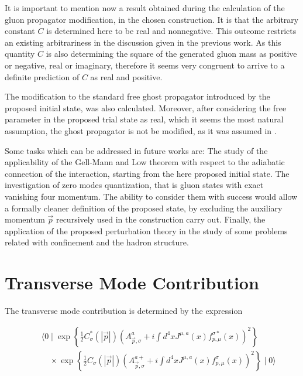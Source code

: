 \documentclass[12pt,letterpaper]{report}
\begin{document}
It is important to mention now a result obtained during the
calculation of the gluon propagator modification, in the chosen
construction. It is that the arbitrary constant $C$ is determined
here to be real and nonnegative. This outcome restricts an
existing arbitrariness in the discussion given in the previous
work. As this quantity $C$ is also determining the square of the
generated gluon mass as positive or negative, real or imaginary,
therefore it seems very congruent to arrive to a definite
prediction of $C$ as real and positive.

The modification to the standard free ghost propagator introduced
by the proposed initial state, was also calculated. Moreover,
after considering the free parameter in the proposed trial state
as real, which it seems the most natural assumption, the ghost
propagator is not be modified, as it was assumed in \cite{Cabo}.

Some tasks which can be addressed in future works are: The study
of the applicability of the Gell-Mann and Low theorem with respect
to the adiabatic connection of the interaction, starting from the
here proposed initial state. The investigation of zero modes
quantization, that is gluon states with exact vanishing four
momentum. The ability to consider them with success would allow a
formally cleaner definition of the proposed state, by excluding
the auxiliary momentum $\vec{p}$ recursively used in the
construction carry out. Finally, the application of the proposed
perturbation theory in the study of some problems related with
confinement and the hadron structure.

\appendix

\chapter{Transverse Mode Contribution}

The transverse mode contribution is determined by the expression

\begin{eqnarray}
&&\langle 0\mid \exp \left\{ \frac 12C_\sigma ^{*}\left(\left|
\vec{p} \right| \right) \left(A_{\vec{p},\sigma }^a+i\int
d^4xJ^{\mu,a}\left(x\right) f_{p,\mu }^{\sigma *}\left(x\right)
\right) ^2\right\} \nonumber
\\ &&\quad\times \exp \left\{ \frac 12C_\sigma \left(\left|
\vec{p}\right| \right) \left(A_{\vec{p},\sigma }^{a+}+i\int
d^4xJ^{\mu,a}\left(x\right) f_{p,\mu }^\sigma \left(x\right)
\right) ^2\right\} \mid 0\rangle \label{A1}
\end{eqnarray}
\end{document}
